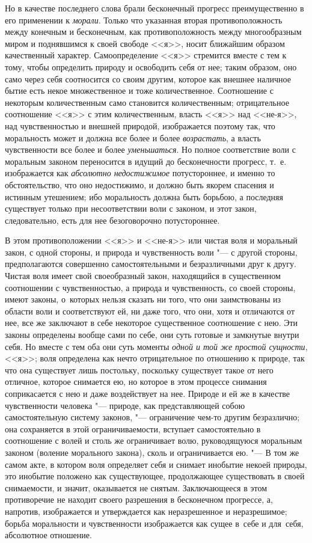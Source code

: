 Но в качестве последнего слова брали бесконечный прогресс преимущественно в его
применении к {\em морали}. Только что указанная вторая противоположность между
конечным и бесконечным, как противоположность между многообразным миром и
поднявшимся к своей свободе <<я>>, носит ближайшим образом качественный
характер. Самоопределение <<я>> стремится вместе с тем к тому, чтобы определить
природу и освободить себя от нее; таким образом, оно само через себя
соотносится со своим другим, которое как внешнее наличное бытие есть некое
множественное и тоже количественное. Соотношение с некоторым количественным
само становится количественным; отрицательное соотношение <<я>> с этим
количественным, власть <<я>> над <<не-я>>, над чувственностью и внешней
природой, изображается поэтому так, что моральность может и должна все более и
более {\em возрастать}, а власть чувственности все более и более
{\em уменьшаться}. Но полное соответствие воли с моральным законом переносится
в идущий до бесконечности прогресс, т.~е. изображается как
{\em абсолютно недостижимое} потустороннее, и именно то обстоятельство, что оно
недостижимо, и должно быть якорем спасения и истинным утешением; ибо
моральность должна быть борьбою, а последняя существует только при
несоответствии воли с законом, и этот закон, следовательно, есть для нее
безоговорочно потустороннее.

В этом противоположении <<я>> и <<не-я>> или чистая воля и моральный закон,
с одной стороны, и природа и чувственность воли "--- с другой стороны,
предполагаются совершенно самостоятельными и безразличными друг к другу. Чистая
воля имеет свой своеобразный закон, находящийся в существенном соотношении
с чувственностью, а природа и чувственность, со своей стороны, имеют законы,
о~которых нельзя сказать ни того, что они заимствованы из области воли и
соответствуют ей, ни даже того, что они, хотя и отличаются от нее, все же
заключают в себе некоторое существенное соотношение с нею. Эти законы
определены вообще сами по себе, они суть готовые и замкнутые внутри себя. Но
вместе с тем оба они суть моменты {\em одной и той же простой сущности}, <<я>>;
воля определена как нечто отрицательное по отношению к природе, так что она
существует лишь постольку, поскольку существует такое от него отличное, которое
снимается ею, но которое в этом процессе снимания соприкасается с нею и даже
воздействует на нее. Природе и ей же в качестве чувственности человека "---
природе, как представляющей собою самостоятельную систему законов, "---
ограничение чем-то другим безразлично; она сохраняется в этой ограничиваемости,
вступает самостоятельно в соотношение с волей и столь же ограничивает волю,
руководящуюся моральным законом (воление морального закона), сколь и
ограничивается ею. "--- В том же самом акте, в котором воля определяет себя и
снимает инобытие некоей природы, это инобытие положено как существующее,
продолжающее существовать в своей снимаемости, и значит, оказывается не снятым.
Заключающееся в этом противоречие не находит своего разрешения в бесконечном
прогрессе, а, напротив, изображается и утверждается как неразрешенное и
неразрешимое; борьба моральности и чувственности изображается как сущее в~себе
и для~себя, абсолютное отношение.

